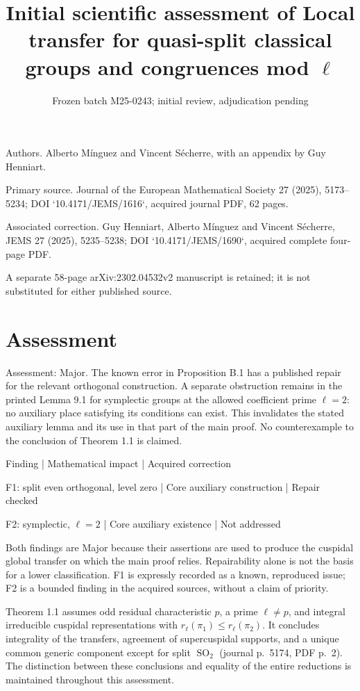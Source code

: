 \documentclass[10pt]{article}
\title{Initial scientific assessment of
Local transfer for quasi-split classical groups and congruences mod \(\ell\)}
\author{}
\date{Frozen batch M25-0243; initial review, adjudication pending}
\begin{document}
\maketitle
Authors. Alberto Mínguez and Vincent Sécherre, with an appendix by Guy Henniart.\par
Primary source. Journal of the European Mathematical Society 27 (2025), 5173–5234; DOI `10.4171/JEMS/1616`, acquired journal PDF, 62 pages.\par
Associated correction. Guy Henniart, Alberto Mínguez and Vincent Sécherre, JEMS 27 (2025), 5235–5238; DOI `10.4171/JEMS/1690`, acquired complete four-page PDF.\par
A separate 58-page arXiv:2302.04532v2 manuscript is retained; it is not substituted for either published source.\par
\section*{Assessment}
Assessment: Major. The known error in Proposition B.1 has a published repair for the relevant orthogonal construction. A separate obstruction remains in the printed Lemma 9.1 for symplectic groups at the allowed coefficient prime \(\ell=2\): no auxiliary place satisfying its conditions can exist. This invalidates the stated auxiliary lemma and its use in that part of the main proof. No counterexample to the conclusion of Theorem 1.1 is claimed.\par
Finding | Mathematical impact | Acquired correction\par
F1: split even orthogonal, level zero | Core auxiliary construction | Repair checked\par
F2: symplectic, \(\ell=2\) | Core auxiliary existence | Not addressed\par
Both findings are Major because their assertions are used to produce the cuspidal global transfer on which the main proof relies. Repairability alone is not the basis for a lower classification. F1 is expressly recorded as a known, reproduced issue; F2 is a bounded finding in the acquired sources, without a claim of priority.\par
Theorem 1.1 assumes odd residual characteristic \(p\), a prime \(\ell\ne p\), and integral irreducible cuspidal representations with \(r_\ell(\pi_1)\le r_\ell(\pi_2)\). It concludes integrality of the transfers, agreement of supercuspidal supports, and a unique common generic component except for split \(\operatorname{SO}_2\) (journal p. 5174, PDF p. 2). The distinction between these conclusions and equality of the entire reductions is maintained throughout this assessment.\par
\end{document}
